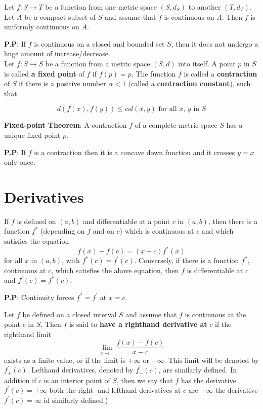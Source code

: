 \documentclass[10pt,a4paper]{book}
\begin{document}
\begin{Thm}
 Let $f : S \rightarrow T$ be a function from one metric space $(S, d_S)$ to another $(T, d_T)$. Let $A$ be a compact subset of $S$ and assume that $f$ is continuous on $A$. Then $f$ is uniformly continuous on $A$.

\end{Thm}
\noindent \textbf{P.P}:  If $f$ is continuous on a closed and bounded set $S$, then it does not undergo a huge amount of increase/decrease.\\

Let $f : S \rightarrow S$ be a function from a metric space $(S, d)$ into itself. A point $p$ in $S$ is called \textbf{a fixed point} of $f$ if $f(p) = p$. The function $f$ is called a \textbf{contraction} of $S$ if there is a positive number $\alpha < 1$ (called a \textbf{contraction constant}), such that

$$d(f(x), f(y)) \leq \alpha d(x,y) \text{  for all $x$, $y$ in $S$} $$
\begin{Thm}
\textbf{Fixed-point Theorem}: A contraction $f$ of a complete metric space $S$ has a unique fixed point $p$.

\end{Thm}

\noindent \textbf{P.P}: If $f$ is a contraction then it is a concave down function and it crosses $y=x$ only once.

\chapter{Derivatives}
\begin{Thm}
If $f$ is defined on $(a, b)$ and differentiable at a point $c$ in $(a, b)$, then there is a function $f^*$ (depending on $f$ and on $c$) which is continuous at $c$ and which satisfies the equation 
   $$f(x)-f(c) =  (x-c)f^*(x)$$
for all $x$ in $(a, b)$, with $f^*(c) = f^\prime(c)$. Conversely, if there is a function $f^*$, continuous at $c$, which satisfies the above equation, then $f$ is differentiable at $c$ and $f^\prime(c) = f^*(c)$.
\end{Thm}
\noindent \textbf{P.P}: Continuity forces $f^* = f^\prime$ at $x = c$. 

\begin{deff}
Let $f$ be defined on a closed interval $S$ and assume that $f$ is continuous at the point $c$ in $S$. Then $f$ is said to \textbf{have a righthand derivative at} $c$ if the righthand limit 
$$\lim_{x \rightarrow ^+} \dfrac{f(x)- f(c)}{x-c}$$
exists as a finite value, or if the limit is $+\infty$ or $-\infty$. This limit will be denoted by $f^\prime_+(c)$. Lefthand derivatives, denoted by $f^\prime_- (c)$, are similarly defined. In addition if $c$ is an interior point of $S$, then we say that $f$ has the derivative $f^\prime(c) = +\infty$ both the right- and lefthand derivatives at $c$ are $+\infty$ the derivative $f^\prime(c) = \infty$ id similarly defined.)

\end{deff}
\end{document}
